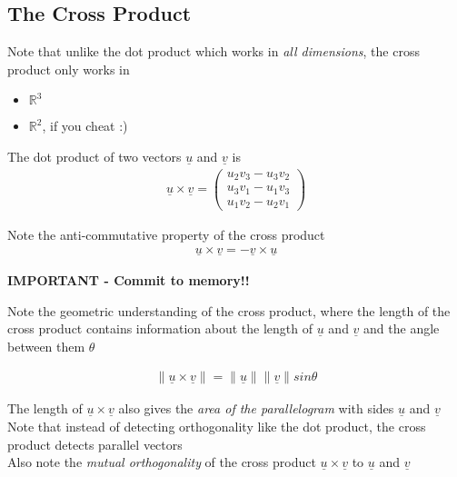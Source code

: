 \subsection{The Cross Product}
\begin{framed}
   Note that unlike the dot product which works in \emph{all dimensions}, the cross product only works in
   \begin{itemize}
      \item $\mathbb{R}^3$
      \item $\mathbb{R}^2$, if you cheat :)
   \end{itemize}

   The dot product of two vectors $ \underline{u }$ and $ \underline{v}$ is 
   \begin{align*}
      \underline{u} \times \underline{v} = \begin{pmatrix} 
        u_2 v_3-u_3 v_2 \\  
        u_3 v_1-u_1 v_3 \\  
        u_1 v_2-u_2 v_1 
      \end{pmatrix}
   \end{align*}

   Note the anti-commutative property of the cross product 
   \begin{align*}
     \underline{u} \times \underline{v} = - \underline{v} \times \underline{u}
   \end{align*}

   \textbf{IMPORTANT - Commit to memory!! }

   Note the geometric understanding of the cross product, where the length of the cross product contains information about the length of  $ \underline{u}$ and $ \underline{v}$ and the angle between them $\theta$

    \begin{align*}
      \lVert \underline{u} \times \underline{v} \rVert = \lVert \underline{u} \rVert \lVert \underline{v} \rVert sin \theta
   \end{align*}

   The length of $ \underline{u} \times \underline{v}$ also gives the \emph{area of the parallelogram} with sides $ \underline{u}$ and $ \underline{v}$ \\

   Note that instead of detecting orthogonality like the dot product, the cross product detects parallel vectors \\

   Also note the \emph{mutual orthogonality} of the cross product $ \underline{u} \times \underline{v}$ to $ \underline{u}$ and $ \underline{v}$
\end{framed}

